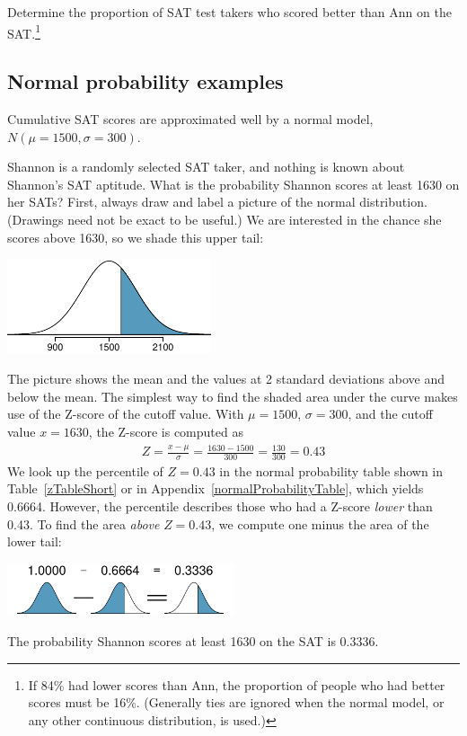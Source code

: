 \begin{exercise}
Determine the proportion of SAT test takers who scored better than Ann on the SAT.\footnote{If 84\% had lower scores than Ann, the proportion of people who had better scores must be 16\%. (Generally ties are ignored when the normal model, or any other continuous distribution, is used.)}
\end{exercise}


\textC{\newpage}


\subsection{Normal probability examples}

Cumulative SAT scores are approximated well by a normal model, $N(\mu=1500, \sigma=300)$.

\begin{example}{Shannon is a randomly selected SAT taker, and nothing is known about Shannon's SAT aptitude. What is the probability Shannon scores at least 1630 on her SATs?}\label{satAbove1630Exam}
First, always draw and label a picture of the normal distribution. (Drawings need not be exact to be useful.) We are interested in the chance she scores above 1630, so we shade this upper tail:
\begin{center}
\includegraphics[width=0.45\textwidth]{ch_distributions/figures/satAbove1630/satAbove1630}
\end{center}
The picture shows the mean and the values at 2 standard deviations above and below the mean. The simplest way to find the shaded area under the curve makes use of the Z-score of the cutoff value. With $\mu=1500$, $\sigma=300$, and the cutoff value $x=1630$, the Z-score is computed as
\begin{eqnarray*}
Z = \frac{x - \mu}{\sigma} = \frac{1630 - 1500}{300} = \frac{130}{300} = 0.43
\end{eqnarray*}
We look up the percentile of $Z=0.43$ in the normal probability table shown in Table~\ref{zTableShort} or in Appendix~\vref{normalProbabilityTable}, which yields 0.6664. However, the percentile describes those who had a Z-score \emph{lower} than 0.43. To find the area \emph{above} $Z=0.43$, we compute one minus the area of the lower tail:
\begin{center}
\includegraphics[width=0.5\textwidth]{ch_distributions/figures/subtractingArea/subtractingArea}
\end{center}
The probability Shannon scores at least 1630 on the SAT is 0.3336.
\end{example}

